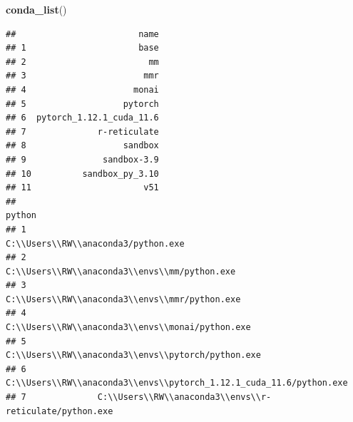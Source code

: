 \documentclass[
]{book}
\newenvironment{Shaded}{\begin{snugshade}}{\end{snugshade}}
\newcommand{\FunctionTok}[1]{\textcolor[rgb]{0.13,0.29,0.53}{\textbf{#1}}}
\newcommand{\NormalTok}[1]{#1}
\theoremstyle{definition}
\theoremstyle{definition}
\theoremstyle{definition}
\theoremstyle{definition}
\theoremstyle{remark}
\begin{document}
\begin{Shaded}
\begin{Highlighting}[]
\FunctionTok{conda\_list}\NormalTok{()}
\end{Highlighting}
\end{Shaded}

\begin{verbatim}
##                        name
## 1                      base
## 2                        mm
## 3                       mmr
## 4                     monai
## 5                   pytorch
## 6  pytorch_1.12.1_cuda_11.6
## 7              r-reticulate
## 8                   sandbox
## 9               sandbox-3.9
## 10          sandbox_py_3.10
## 11                      v51
##                                                                 python
## 1                                  C:\\Users\\RW\\anaconda3/python.exe
## 2                        C:\\Users\\RW\\anaconda3\\envs\\mm/python.exe
## 3                       C:\\Users\\RW\\anaconda3\\envs\\mmr/python.exe
## 4                     C:\\Users\\RW\\anaconda3\\envs\\monai/python.exe
## 5                   C:\\Users\\RW\\anaconda3\\envs\\pytorch/python.exe
## 6  C:\\Users\\RW\\anaconda3\\envs\\pytorch_1.12.1_cuda_11.6/python.exe
## 7              C:\\Users\\RW\\anaconda3\\envs\\r-reticulate/python.exe

\end{verbatim}
\end{document}
